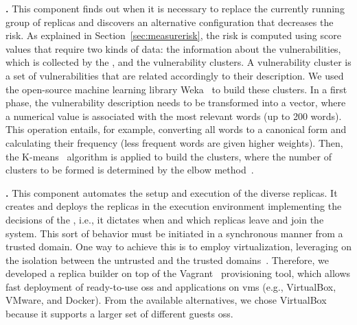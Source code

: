  \textbf{\risk.} This component finds out when it is necessary to replace the currently running group of replicas and discovers an alternative configuration that decreases the risk. 
As explained in Section~\ref{sec:measurerisk}, the risk is computed using score values that require two kinds of data: the information about the vulnerabilities, which is collected by the \fetcher, and the vulnerability clusters. 
A vulnerability cluster is a set of vulnerabilities that are related accordingly to their description.
We used the open-source machine learning library Weka~\cite{weka} to build these clusters. 
In a first phase, the vulnerability description needs to be transformed into a vector, where a numerical value is associated with the most relevant words (up to 200 words). 
This operation entails, for example, converting all words to a canonical form and calculating their frequency (less frequent words are given higher weights).
Then, the K-means~\cite{Jain:2010} algorithm is applied to build the clusters, where the number of clusters to be formed is determined by the elbow method~\cite{Thorndike:1953}.



 \textbf{\manager.} 
This component automates the setup and execution of the diverse replicas. 
It creates and deploys the replicas in the execution environment implementing the decisions of the \risk, i.e., it dictates when and which replicas leave and join the system. 
This sort of behavior must be initiated in a synchronous manner from a trusted domain. %
One way to achieve this is to employ virtualization, leveraging on the isolation between the untrusted and the trusted domains~\cite{Sousa:2010,Platania:2014,Distler:2011}.
Therefore, we developed a replica builder on top of the Vagrant~\cite{vagrant} provisioning tool, which allows fast deployment of ready-to-use \glspl{os} and applications on \glspl{vm} (e.g., VirtualBox, VMware, and Docker).
From the available alternatives, we chose VirtualBox~\cite{virtualbox} because it supports a larger set of different guests \glspl{os}.



